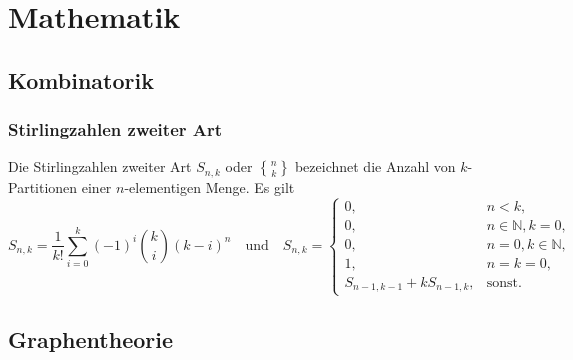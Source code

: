 \section{Mathematik}

\subsection{Kombinatorik}

\subsubsection{Stirlingzahlen zweiter Art}
Die Stirlingzahlen zweiter Art $S_{n, k}$ oder ${n \brace k}$ bezeichnet die Anzahl von $k$-Partitionen einer $n$-elementigen Menge. Es gilt
\begin{equation*}
	S_{n, k} = \frac{1}{k!} \sum_{i=0}^{k} (-1)^i {k \choose i} (k-i)^n \quad \text{und} \quad
	S_{n, k} = \begin{cases}
	0, &n < k, \\
	0, &n \in \mathbb{N}, k = 0, \\
	0, &n = 0, k \in \mathbb{N}, \\
	1, &n = k = 0, \\
	S_{n-1, k-1} + kS_{n-1,k}, &\text{sonst}.
	\end{cases}
\end{equation*}

\subsection{Graphentheorie}
